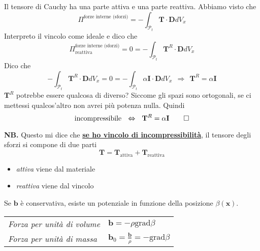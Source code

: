 \documentclass[10pt,a4paper,twoside]{book}
\begin{document}
Il tensore di Cauchy ha una parte attiva e una parte reattiva. Abbiamo visto che
\begin{equation*}
\Pi ^{\text{forze interne (sforzi)}} =-\int _{\mathcal{P}_{t}}\mathbf{T} \cdotp \mathbf{D} dV_{x}
\end{equation*}
Interpreto il vincolo come ideale e dico che
\begin{equation*}
\Pi ^{\text{forze interne (sforzi)}}_{\text{reattiva}} =0=-\int _{\mathcal{P}_{t}}\mathbf{T}^{R} \cdotp \mathbf{D} dV_{x}
\end{equation*}
Dico che
\begin{equation*}
-\int _{\mathcal{P}_{t}}\mathbf{T}^{R} \cdotp \mathbf{D} dV_{x} =0=-\int _{\mathcal{P}_{t}} \alpha \mathbf{I} \cdotp \mathbf{D} dV_{x} \ \ \Rightarrow \ \ \mathbf{T}^{R} =\alpha \mathbf{I}
\end{equation*}
$\mathbf{T}^{R}$ potrebbe essere qualcosa di diverso? Siccome gli spazi sono ortogonali, se ci mettessi qualcos'altro non avrei più potenza nulla. Quindi
\begin{equation*}
\text{incompressibile} \ \ \Leftrightarrow \ \ \mathbf{T}^{R} =\alpha \mathbf{I}\qed 
\end{equation*}


\textbf{NB.} Questo mi dice che \underline{\textbf{se ho vincolo di incompressibilità}}, il tensore degli sforzi si compone di due parti
\begin{equation*}
\boxed{\mathbf{T} =\mathbf{T}_{\text{attiva}} +\mathbf{T}_{\text{reattiva}}}
\end{equation*}
\begin{itemize}
\item \textit{attiva} viene dal materiale
\item \textit{reattiva} viene dal vincolo
\end{itemize}


\begin{oss}
Se $\mathbf{b}$ è conservativa, esiste un potenziale in funzione della posizione $\beta (\mathbf{x})$.
\end{oss}
\begin{center}

\begin{tabular}{ll}
\textit{Forza per unità di volume} & $\mathbf{b} =-\rho \mathrm{grad} \beta $ \\
\textit{Forza per unità di massa} & $\mathbf{b}_{0} =\frac{\mathbf{b}}{\rho } =-\mathrm{grad} \beta $ \\

\end{tabular}
\end{center}
\end{document}
